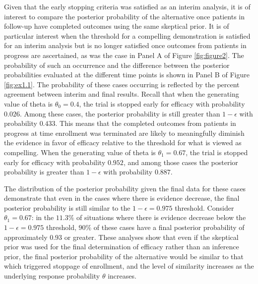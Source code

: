 \documentclass[AMA,STIX1COL,doublespace]{WileyNJD-v2}
\begin{document}
Given that the early stopping criteria was satisfied as an interim analysis, it is of interest to compare the posterior probability of the alternative once patients in follow-up have completed outcomes using the same skeptical prior.
%
It is of particular interest when the threshold for a compelling demonstration is satisfied for an interim analysis but is no longer satisfied once outcomes from patients in progress are ascertained, as was the case in Panel A of Figure \ref{fig:figure2}.
%
The probability of such an occurrence and the difference between the posterior probabilities evaluated at the different time points is shown in Panel B of Figure \ref{fig:ex1.1}.
%
The probability of these cases occurring is reflected by the percent agreement between interim and final results.
%
Recall that when the generating value of theta is $\theta_0=0.4$, the trial is stopped early for efficacy with probability $0.026$. Among these cases, the posterior probability is still greater than $1-\epsilon$ with probability $0.433$. 
%
This means that the completed outcomes from patients in progress at time enrollment was terminated are likely to meaningfully diminish the evidence in favor of efficacy relative to the threshold for what is viewed as compelling.
%
When the generating value of theta is $\theta_1=0.67$, the trial is stopped early for efficacy with probability $0.952$, and among those cases the posterior probability is  greater than $1-\epsilon$ with probability $0.887$.

The distribution of the posterior probability given the final data for these cases demonstrate that even in the cases where there is evidence decrease, the final posterior probability is still similar to the $1-\epsilon=0.975$ threshold.
%
Consider $\theta_1=0.67$: in the $11.3\%$ of situations where there is evidence decrease below the $1-\epsilon=0.975$ threshold, $90\%$ of these cases have a final posterior probability of approximately $0.93$ or greater. 
%
These analyses show that even if the skeptical prior was used for the final determination of efficacy rather than an inference prior, the final posterior probability of the alternative would be similar to that which triggered stoppage of enrollment, and the level of similarity increases as the underlying response probability $\theta$ increases.
%
\end{document}
